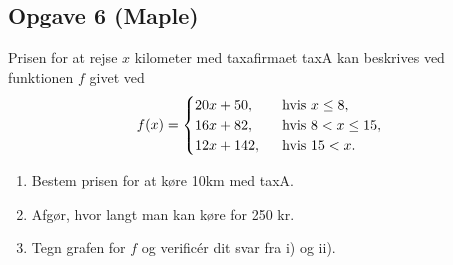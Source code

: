 \subsection*{Opgave 6 (Maple)}
Prisen for at rejse $x$ kilometer med taxafirmaet taxA kan beskrives ved funktionen $f$ givet ved
\begin{align*}
	f(x) =
	\begin{cases}
		20x + 50, \ &\textnormal{ hvis } x \leq 8, \\
		16x + 82, \ &\textnormal{ hvis } 8 < x \leq 15, \\
		12x + 142, \ &\textnormal{ hvis } 15 < x.
	\end{cases}
\end{align*}

\begin{enumerate}[label = \roman*)]
	\item Bestem prisen for at køre 10km med taxA.
	\item Afgør, hvor langt man kan køre for 250 kr.
	\item Tegn grafen for $f$ og verificér dit svar fra i) og ii).
\end{enumerate}


